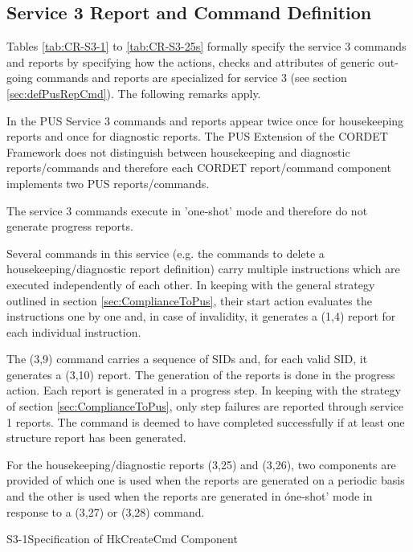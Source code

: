 \documentclass[a4paper,10pt]{article}
\newenvironment{fw_itemize}						%
{\begin{itemize}
  \setlength{\itemsep}{1mm}
  \setlength{\parskip}{0pt}
  \setlength{\parsep}{0pt}}
{\end{itemize}}
\newenvironment{cr_cmd}[2]
{
\begin{longtable}{|p{3cm}|p{9.6cm}|}
\caption{#2} \label{tab:CR-#1} \\
\hline
\rowcolor{light-gray}
\DTLforeach*{dbCmd}{\att=Attribute,\attValue=#1}
{\DTLiffirstrow{}{\\\hline}\att & \attValue}\\\hline
}
{\end{longtable}}
\begin{document}
\subsection{Service 3 Report and Command Definition}\label{sec:serv3RepCmdDef}
Tables \ref{tab:CR-S3-1} to \ref{tab:CR-S3-25s} formally specify the service 3 commands and reports by specifying how the actions, checks and attributes of generic out-going commands and reports are specialized for service 3 (see section \ref{sec:defPusRepCmd}). The following remarks apply.

\begin{fw_itemize}
\item In the PUS Service 3 commands and reports appear twice once for housekeeping reports and once for diagnostic reports. The PUS Extension of the CORDET Framework does not distinguish between housekeeping and diagnostic reports/commands and therefore each CORDET report/command component implements two PUS reports/commands.
\item The service 3 commands execute in 'one-shot' mode and therefore do not generate progress reports.
\item Several commands in this service (e.g. the commands to delete a housekeeping/diagnostic report definition) carry multiple instructions which are executed independently of each other. In keeping with the general strategy outlined in section \ref{sec:ComplianceToPus}, their start action evaluates the instructions one by one and, in case of invalidity, it generates a (1,4) report for each individual instruction.
\item The (3,9) command carries a sequence of SIDs and, for each valid SID, it generates a (3,10) report. The generation of the reports is done in the progress action. Each report is generated in a progress step. In keeping with the strategy of section \ref{sec:ComplianceToPus}, only step failures are reported through service 1 reports. The command is deemed to have completed successfully if at least one structure report has been generated. 
\item For the housekeeping/diagnostic reports (3,25) and (3,26), two components are provided of which one is used when the reports are generated on a periodic basis and the other is used when the reports are generated in óne-shot' mode in response to a (3,27) or (3,28) command.
\end{fw_itemize}

\newpage
\begin{cr_cmd}{S3-1}{Specification of HkCreateCmd Component}
\end{cr_cmd}
\end{document}
